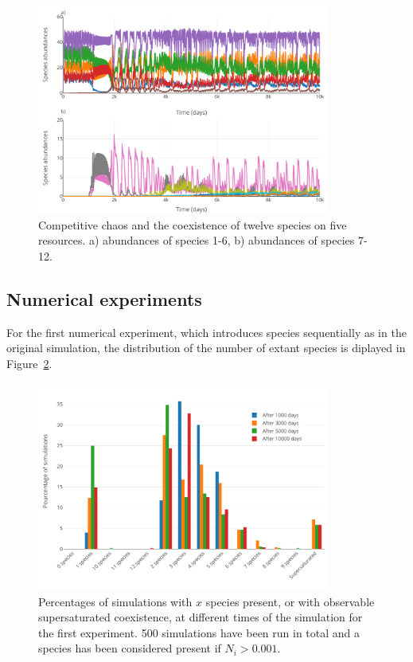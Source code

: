 \begin{figure}[H]
	\begin{center} 
		\includegraphics[width=0.86\textwidth]{../Code/Figures/Figure_4.pdf}
 		\caption{Competitive chaos and the coexistence of twelve species on five resources. a) abundances of species 1-6, b) abundances of species 7-12. }
 		\label{figures:Fig4}
	\end{center}
\end{figure}

\subsection{Numerical experiments}

For the first numerical experiment, which introduces species sequentially as in the original simulation, the distribution of the number of extant species is diplayed in Figure~\ref{figures:Figexp1bar}.

\begin{figure}[H]
	\begin{center} 
		\includegraphics[width=0.86\textwidth]{../Code/Figures/Figure_exp1_bar.pdf}
 		\caption{Percentages of simulations with $x$ species present, or with observable supersaturated coexistence, at different times of the simulation for the first experiment. 500 simulations have been run in total and a species has been considered present if $N_i > 0.001$.}
 		\label{figures:Figexp1bar}
	\end{center}
\end{figure}

